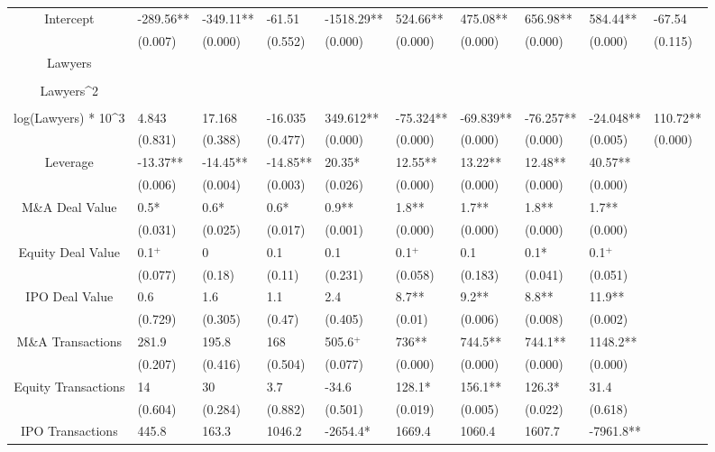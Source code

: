 \documentclass{article}
\begin{document}
\begin{table}[H]
\begin{tabular}{|clllllllll|}
Intercept & -289.56** & -349.11** & -61.51 & -1518.29** & 524.66** & 475.08** & 656.98** & 584.44** & -67.54 \\ 
   & (0.007) & (0.000) & (0.552) & (0.000) & (0.000) & (0.000) & (0.000) & (0.000) & (0.115) \\ 
  Lawyers &  &  &  &  &  &  &  &  &  \\ 
   &  &  &  &  &  &  &  &  &  \\ 
  Lawyers^2 &  &  &  &  &  &  &  &  &  \\ 
   &  &  &  &  &  &  &  &  &  \\ 
  log(Lawyers) * 10^3 & 4.843 & 17.168 & -16.035 & 349.612** & -75.324** & -69.839** & -76.257** & -24.048** & 110.72** \\ 
   & (0.831) & (0.388) & (0.477) & (0.000) & (0.000) & (0.000) & (0.000) & (0.005) & (0.000) \\ 
  Leverage & -13.37** & -14.45** & -14.85** & 20.35* & 12.55** & 13.22** & 12.48** & 40.57** &  \\ 
   & (0.006) & (0.004) & (0.003) & (0.026) & (0.000) & (0.000) & (0.000) & (0.000) &  \\ 
  M\&A Deal Value & 0.5* & 0.6* & 0.6* & 0.9** & 1.8** & 1.7** & 1.8** & 1.7** &  \\ 
   & (0.031) & (0.025) & (0.017) & (0.001) & (0.000) & (0.000) & (0.000) & (0.000) &  \\ 
  Equity Deal Value & 0.1$^{+}$ & 0 & 0.1 & 0.1 & 0.1$^{+}$ & 0.1 & 0.1* & 0.1$^{+}$ &  \\ 
   & (0.077) & (0.18) & (0.11) & (0.231) & (0.058) & (0.183) & (0.041) & (0.051) &  \\ 
  IPO Deal Value & 0.6 & 1.6 & 1.1 & 2.4 & 8.7** & 9.2** & 8.8** & 11.9** &  \\ 
   & (0.729) & (0.305) & (0.47) & (0.405) & (0.01) & (0.006) & (0.008) & (0.002) &  \\ 
  M\&A Transactions & 281.9 & 195.8 & 168 & 505.6$^{+}$ & 736** & 744.5** & 744.1** & 1148.2** &  \\ 
   & (0.207) & (0.416) & (0.504) & (0.077) & (0.000) & (0.000) & (0.000) & (0.000) &  \\ 
  Equity Transactions & 14 & 30 & 3.7 & -34.6 & 128.1* & 156.1** & 126.3* & 31.4 &  \\ 
   & (0.604) & (0.284) & (0.882) & (0.501) & (0.019) & (0.005) & (0.022) & (0.618) &  \\ 
  IPO Transactions & 445.8 & 163.3 & 1046.2 & -2654.4* & 1669.4 & 1060.4 & 1607.7 & -7961.8** &  \\ 

\end{tabular}
\end{table}
\end{document}
